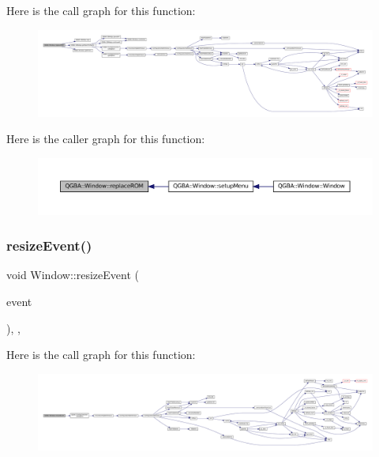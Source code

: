 Here is the call graph for this function\+:
\nopagebreak
\begin{figure}[H]
\begin{center}
\leavevmode
\includegraphics[width=350pt]{class_q_g_b_a_1_1_window_a6a7f2bc2a0c283d8de4304e383e5eac6_cgraph}
\end{center}
\end{figure}
Here is the caller graph for this function\+:
\nopagebreak
\begin{figure}[H]
\begin{center}
\leavevmode
\includegraphics[width=350pt]{class_q_g_b_a_1_1_window_a6a7f2bc2a0c283d8de4304e383e5eac6_icgraph}
\end{center}
\end{figure}
\mbox{\label{class_q_g_b_a_1_1_window_adac05c3906a40aa9166786fca33e7ecc}} 
\subsubsection{\texorpdfstring{resize\+Event()}{resizeEvent()}}
{\footnotesize\ttfamily void Window\+::resize\+Event (\begin{DoxyParamCaption}\item[{Q\+Resize\+Event $\ast$}]{event }\end{DoxyParamCaption})\hspace{0.3cm}{\ttfamily [override]}, {\ttfamily [protected]}, {\ttfamily [virtual]}}

Here is the call graph for this function\+:
\nopagebreak
\begin{figure}[H]
\begin{center}
\leavevmode
\includegraphics[width=350pt]{class_q_g_b_a_1_1_window_adac05c3906a40aa9166786fca33e7ecc_cgraph}
\end{center}
\end{figure}
\mbox{\label{class_q_g_b_a_1_1_window_a6486c6d4704a8b38ee542611f1ca97fc}} 
